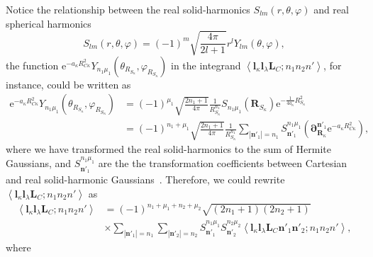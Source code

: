 \documentclass[a4paper,11pt,twoside,openright]{book}
\begin{document}
Notice the relationship between the real solid-harmonics $S_{lm}(r,\theta,\varphi)$ and
real spherical harmonics~\cite{Helgaker:2000}
\begin{equation}
  S_{lm}(r,\theta,\varphi)=(-1)^{m}\sqrt{\frac{4\pi}{2l+1}}r^{l}Y_{lm}(\theta,\varphi),
\end{equation}
the function $\mathrm{e}^{-a_{\kappa}R_{C\kappa}^{2}}Y_{n_1\mu_1}\left(\theta_{R_{S_{\kappa}}},\varphi_{R_{S_{\kappa}}}\right)$
in the integrand $\left\langle\boldsymbol{l}_{\kappa}\boldsymbol{l}_{\lambda}\boldsymbol{L}_{C};n_{1}n_{2}n'\right\rangle$,
for instance, could be written as
\begin{align}
  \mathrm{e}^{-a_{\kappa}R_{C\kappa}^{2}}Y_{n_1\mu_1}\left(\theta_{R_{S_{\kappa}}},\varphi_{R_{S_{\kappa}}}\right)
  &=(-1)^{\mu_{1}}\sqrt{\frac{2n_{1}+1}{4\pi}}\frac{1}{R_{S_{\kappa}}^{n_{1}}}%
    S_{n_{1}\mu_{1}}(\boldsymbol{R}_{S_{\kappa}})\mathrm{e}^{-\frac{1}{4a_{\kappa}}R_{S_{\kappa}}^{2}}\\
  &=(-1)^{n_{1}+\mu_{1}}\sqrt{\frac{2n_{1}+1}{4\pi}}\frac{1}{R_{S_{\kappa}}^{n_{1}}}%
    \sum_{|\boldsymbol{n}'_{1}|=n_{1}}S_{\boldsymbol{n}'_{1}}^{n_{1}\mu_{1}}%
    \left(\boldsymbol{\partial}_{\boldsymbol{R}_{\kappa}}^{\boldsymbol{n}'_{1}}%
      \mathrm{e}^{-a_{\kappa}R_{C\kappa}^{2}}\right),\nonumber
\end{align}
where we have transformed the real solid-harmonics to the sum of Hermite Gaussians,
and $S_{\boldsymbol{n}'_{1}}^{n_{1}\mu_{1}}$ are the the transformation coefficients
between Cartesian and real solid-harmonic Gaussians~\cite{Reine:PCCP9:4771}.
Therefore, we could rewrite $\left\langle\boldsymbol{l}_{\kappa}\boldsymbol{l}_{\lambda}\boldsymbol{L}_{C};n_{1}n_{2}n'\right\rangle$ as
\begin{align}
  \left\langle\boldsymbol{l}_{\kappa}\boldsymbol{l}_{\lambda}\boldsymbol{L}_{C};n_{1}n_{2}n'\right\rangle
  &=(-1)^{n_{1}+\mu_{1}+n_{2}+\mu_{2}}\sqrt{(2n_{1}+1)(2n_{2}+1)}\\
  &\times\sum_{|\boldsymbol{n}'_{1}|=n_{1}}\sum_{|\boldsymbol{n}'_{2}|=n_{2}}%
    S_{\boldsymbol{n}'_{1}}^{n_{1}\mu_{1}}S_{\boldsymbol{n}'_{2}}^{n_{2}\mu_{2}}%
    \left\langle\boldsymbol{l}_{\kappa}\boldsymbol{l}_{\lambda}\boldsymbol{L}_{C}%
      \boldsymbol{n}'_{1}\boldsymbol{n}'_{2};n_{1}n_{2}n'\right\rangle,\nonumber
\end{align}
where
\end{document}
